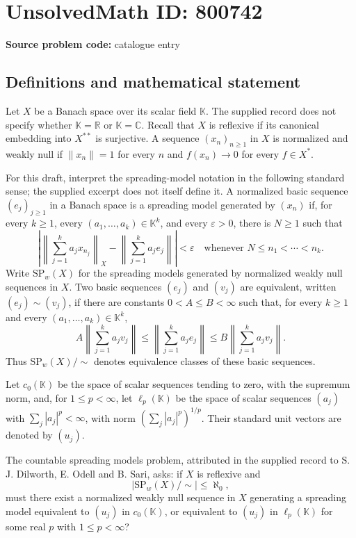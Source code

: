 \documentclass[11pt]{article}
\newcommand{\R}{\mathbb{R}}
\newcommand{\C}{\mathbb{C}}
\begin{document}
\section*{UnsolvedMath ID: 800742}
\textbf{Source problem code:} catalogue entry
\subsection{Definitions and mathematical statement}
Let \(X\) be a Banach space over its scalar field \(\mathbb K\). The supplied record does not specify whether \(\mathbb K=\R\) or \(\mathbb K=\C\). Recall that \(X\) is reflexive if its canonical embedding into \(X^{**}\) is surjective. A sequence \((x_n)_{n\geq1}\) in \(X\) is normalized and weakly null if \(\|x_n\|=1\) for every \(n\) and \(f(x_n)\to0\) for every \(f\in X^*\).

For this draft, interpret the spreading-model notation in the following standard sense; the supplied excerpt does not itself define it. A normalized basic sequence \((e_j)_{j\geq1}\) in a Banach space is a spreading model generated by \((x_n)\) if, for every \(k\geq1\), every \((a_1,\ldots,a_k)\in\mathbb K^k\), and every \(\varepsilon>0\), there is \(N\geq1\) such that
\[
\left|\left\|\sum_{j=1}^k a_jx_{n_j}\right\|_X-\left\|\sum_{j=1}^k a_je_j\right\|\right|<\varepsilon
\quad\text{whenever }N\leq n_1<\cdots<n_k.
\]
Write \(\mathrm{SP}_w(X)\) for the spreading models generated by normalized weakly null sequences in \(X\). Two basic sequences \((e_j)\) and \((v_j)\) are equivalent, written \((e_j)\sim(v_j)\), if there are constants \(0<A\leq B<\infty\) such that, for every \(k\geq1\) and every \((a_1,\ldots,a_k)\in\mathbb K^k\),
\[
A\left\|\sum_{j=1}^k a_jv_j\right\|
\leq\left\|\sum_{j=1}^k a_je_j\right\|
\leq B\left\|\sum_{j=1}^k a_jv_j\right\|.
\]
Thus \(\mathrm{SP}_w(X)/{\sim}\) denotes equivalence classes of these basic sequences.

Let \(c_0(\mathbb K)\) be the space of scalar sequences tending to zero, with the supremum norm, and, for \(1\leq p<\infty\), let \(\ell_p(\mathbb K)\) be the space of scalar sequences \((a_j)\) with \(\sum_j|a_j|^p<\infty\), with norm \((\sum_j|a_j|^p)^{1/p}\). Their standard unit vectors are denoted by \((u_j)\).

The countable spreading models problem, attributed in the supplied record to S. J. Dilworth, E. Odell and B. Sari, asks: if \(X\) is reflexive and
\[
\bigl|\mathrm{SP}_w(X)/{\sim}\bigr|\leq\aleph_0,
\]
must there exist a normalized weakly null sequence in \(X\) generating a spreading model equivalent to \((u_j)\) in \(c_0(\mathbb K)\), or equivalent to \((u_j)\) in \(\ell_p(\mathbb K)\) for some real \(p\) with \(1\leq p<\infty\)?
\end{document}
